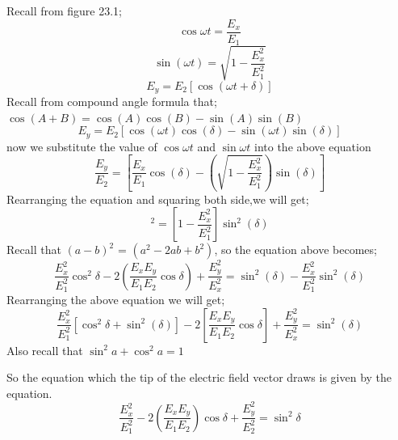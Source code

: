 Recall from figure 23.1; 
\begin{equation}
\cos{\omega t} = \frac{E_x}{E_1}
\end{equation}
\begin{equation}
\sin (\omega t) = \sqrt{1-\frac{E_{x}^2}{E_{1}^2}}
\end{equation}
\begin{equation}
E_y = E_2 [\cos(\omega t + \delta)]
\end{equation}
Recall from compound angle formula that; $\cos(A+B) = \cos(A)\cos(B) - \sin(A)\sin(B)$ 
\begin{equation}
E_y = E_2 [\cos(\omega t)\cos(\delta) -\sin(\omega t) \sin(\delta)]
\end{equation}
now we substitute the value of $\cos{\omega t}$ and $\sin {\omega t}$ into the above equation
\begin{equation}
\frac{E_y}{E_2} =[\frac{E_x}{E_1}\cos(\delta) -(\sqrt{1 - \frac{E_{x}^2}{E_{1}^2}})\sin(\delta)]
\end{equation}
Rearranging the equation and squaring both side,we will get;
\begin{equation}
[\frac{E_x}{E_1}\cos{\delta }-\frac{E_y}{E_2}]^2 = [1 - \frac{E_{x}^2}{E_{1}^2}]\sin^2(\delta)
\end{equation}
Recall that ${(a - b)}^2$ = $(a^2 -2ab +b^2)$, so the equation above becomes;
\begin{dmath}
\frac{E_{x}^2}{E_{1}^2}\cos^2{\delta} -2(\frac{E_{x}E_{y}}{E_{1}E_{2}}\cos{\delta}) + \frac{E_{y}^2}{E_{x}^2} = \sin^2(\delta)-\frac{E_{x}^2}{E_{1}^2}\sin^2(\delta)
\end{dmath}
Rearranging the above equation we will get;
\begin{equation}
\frac{E_{x}^2}{E_{1}^2}[\cos^2{\delta} + \sin ^2(\delta)] - 2[\frac{E_{x}E_{y}}{E_{1}E_{2}}\cos{\delta}] + \frac{E_{y}^2}{E_{x}^2} = \sin^2(\delta)
\end{equation}
Also recall that $ \sin^2{a} + \cos^2{a} =  1$

So the equation which the tip of the electric field vector draws is given by the equation.
\begin{equation}
\frac{E_{x}^2}{E_{1}^2} -2(\frac{E_{x}E_{y}}{E_{1}E_{2}})\cos\delta + \frac{E_{y}^2}{E_{2}^2} =\sin^2 \delta
\end{equation}

